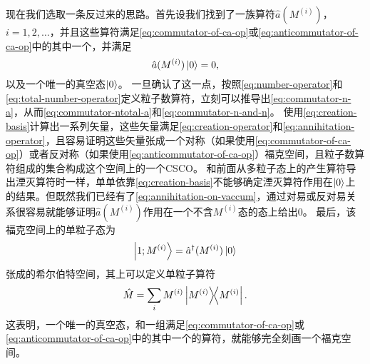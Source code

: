 \documentclass[UTF8, a4paper]{ctexart}
\begin{document}
现在我们选取一条反过来的思路。首先设我们找到了一族算符$\hat{a}(M^{(i)})$，$i=1, 2, \ldots$，并且这些算符满足\eqref{eq:commutator-of-ca-op}或\eqref{eq:anticommutator-of-ca-op}中的其中一个，并满足
\begin{equation}
    \hat{a}(M^{(i)}) \ket{0} = 0,
    \label{eq:annihitation-on-vaccum}
\end{equation}
以及一个唯一的真空态$\ket{0}$。
一旦确认了这一点，按照\eqref{eq:number-operator}和\eqref{eq:total-number-operator}定义粒子数算符，立刻可以推导出\eqref{eq:commutator-n-a}，从而\eqref{eq:commutator-ntotal-a}和\eqref{eq:commutator-n-and-n}。
使用\eqref{eq:creation-basis}计算出一系列矢量，这些矢量满足\eqref{eq:creation-operator}和\eqref{eq:annihitation-operator}，且容易证明这些矢量张成一个对称（如果使用\eqref{eq:commutator-of-ca-op}）或者反对称（如果使用\eqref{eq:anticommutator-of-ca-op}）福克空间，且粒子数算符组成的集合构成这个空间上的一个CSCO。
和前面从多粒子态上的产生算符导出湮灭算符时一样，单单依靠\eqref{eq:creation-basis}不能够确定湮灭算符作用在$\ket{0}$上的结果。但既然我们已经有了\eqref{eq:annihitation-on-vaccum}，通过对易或反对易关系很容易就能够证明$\hat{a}(M^{(i)})$作用在一个不含$M^{(i)}$态的态上给出$0$。
最后，该福克空间上的单粒子态为
\begin{equation}
    \ket{1;M^{(i)}} = \hat{a}^\dagger (M^{(i)}) \ket{0}
\end{equation}
张成的希尔伯特空间，其上可以定义单粒子算符
\begin{equation}
    \hat{M} = \sum_i M^{(i)} \dyad{M^{(i)}}.
\end{equation}
这表明，一个唯一的真空态，和一组满足\eqref{eq:commutator-of-ca-op}或\eqref{eq:anticommutator-of-ca-op}中的其中一个的算符，就能够完全刻画一个福克空间。
\end{document}
